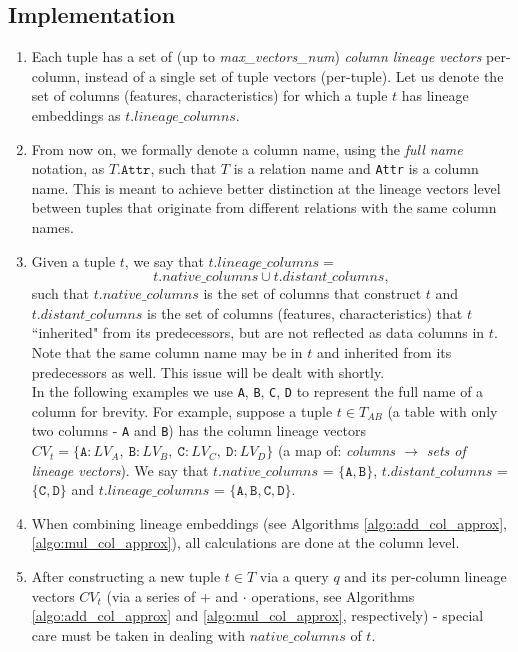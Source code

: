 \subsection{Implementation} 
\begin{enumerate}
    \item Each tuple has a set of (up to \textit{max\_vectors\_num}) \textit{column lineage vectors} per-column, instead of a single set of tuple vectors (per-tuple). Let us denote the set of columns (features, characteristics) for which a tuple $t$ has lineage embeddings as $t.lineage\_columns$.
    \item From now on, we formally denote a column name, using the \textit{full name} notation, as $T.\texttt{Attr}$, such that $T$ is a relation name and \texttt{Attr} is a column name. This is meant to achieve better distinction at the lineage vectors level between tuples that originate from different relations with the same column names. 
    \item Given a tuple $t$, we say that $t.lineage\_columns = $
        \begin{equation*}
            t.native\_columns \cup t.distant\_columns,
        \end{equation*}
    such that $t.native\_columns$ is the set of columns that construct $t$ and $t.distant\_columns$ is the set of columns (features, characteristics) that $t$ ``inherited" from its predecessors, but are not reflected as data columns in $t$.
    Note that the same column name may be in $t$ and inherited from its predecessors as well. This issue will be dealt with shortly.\\
    In the following examples we use \texttt{A}, \texttt{B}, \texttt{C}, \texttt{D} to represent the full name of a column for brevity. For example, suppose a tuple $t \in T_{AB}$ (a table with only two columns - \texttt{A} and \texttt{B}) has the column lineage vectors $CV_t = \{\texttt{A}\!: LV_A,\: \texttt{B}\!: LV_B,\: \texttt{C}\!: LV_C,\: \texttt{D}\!: LV_D\}$ (a map of: \textit{columns $\rightarrow$ sets of lineage vectors}). We say that $t.native\_columns$ = $\{\texttt{A}, \texttt{B}\}$, $t.distant\_columns$ = $\{\texttt{C}, \texttt{D}\}$ and $t.lineage\_columns$ = $\{\texttt{A}, \texttt{B}, \texttt{C}, \texttt{D}\}$.
    \item When combining lineage embeddings (see Algorithms \ref{algo:add_col_approx},\ref{algo:mul_col_approx}), all calculations are done at the column level.
    \item After constructing a new tuple $t \in T$ via a query $q$ and its per-column lineage vectors $CV_t$ (via a series of + and $\cdot$ operations, see Algorithms \ref{algo:add_col_approx} and \ref{algo:mul_col_approx}, respectively) - special care must be taken in dealing with $native\_columns$ of $t$.

\end{enumerate}
